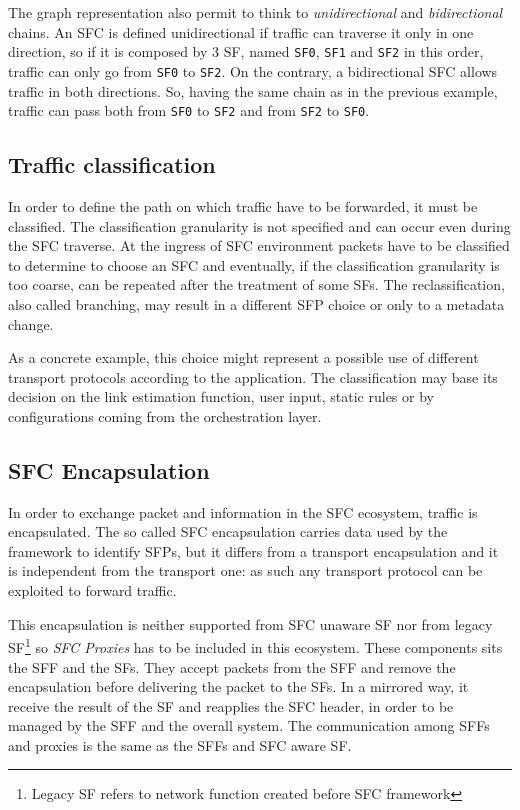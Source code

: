 The graph representation also permit to think to \emph{unidirectional} and
\emph{bidirectional} chains. An SFC is defined unidirectional if traffic can
traverse it only in one direction, so if it is composed by 3 SF, named
\texttt{SF0}, \texttt{SF1} and \texttt{SF2} in this order, traffic can only go
from \texttt{SF0} to \texttt{SF2}. On the contrary, a bidirectional SFC allows
traffic in both directions. So, having the same chain as in the previous
example, traffic can pass both from \texttt{SF0} to \texttt{SF2} and from
\texttt{SF2} to \texttt{SF0}.

\subsection{Traffic classification}
In order to define the path on which traffic have to be forwarded, it must be
classified. The classification granularity is not specified and can occur even
during the SFC traverse. At the ingress of SFC environment packets have to be
classified to determine to choose an SFC and eventually, if the classification
granularity is too coarse, can be repeated after the treatment of some SFs. The
reclassification, also called branching, may result in a different SFP choice or
only to a metadata change.

As a concrete example, this choice might represent a possible use of different
transport protocols according to the application. The classification may base
its decision on the link estimation function, user input, static rules or
by configurations coming from the orchestration layer.

\subsection{SFC Encapsulation}
In order to exchange packet and information in the SFC ecosystem, traffic is
encapsulated. The so called SFC encapsulation carries data used by the
framework to identify SFPs, but it differs from a transport encapsulation and it
is independent from the transport one: as such any transport protocol can be
exploited to forward traffic.

This encapsulation is neither supported from SFC unaware SF nor from legacy 
SF\footnote{Legacy SF refers to network function created before SFC framework}
so \emph{SFC Proxies} has to be included in this ecosystem. These components
sits the SFF and the SFs. They accept packets from the SFF and remove the
encapsulation before delivering the packet to the SFs. In a mirrored way, it
receive the result of the SF and reapplies the SFC header, in order to be
managed by the SFF and the overall system. The communication among SFFs and
proxies is the same as the SFFs and SFC aware SF.

